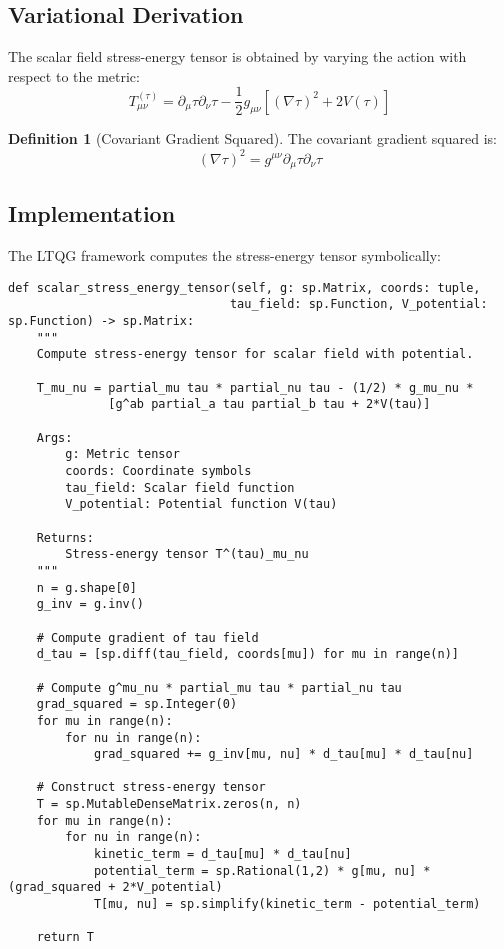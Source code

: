 \documentclass[11pt,a4paper]{article}
\theoremstyle{definition}
\newtheorem{definition}[theorem]{Definition}
\theoremstyle{remark}
\newcommand{\covd}{\nabla}
\begin{document}
\subsection{Variational Derivation}

The scalar field stress-energy tensor is obtained by varying the action with respect to the metric:
\begin{equation}
T_{\mu\nu}^{(\tau)} = \partial_\mu \tau \partial_\nu \tau - \frac{1}{2} g_{\mu\nu} \left[ (\covd \tau)^2 + 2V(\tau) \right]
\end{equation}

\begin{definition}[Covariant Gradient Squared]
The covariant gradient squared is:
\begin{equation}
(\covd \tau)^2 = g^{\mu\nu} \partial_\mu \tau \partial_\nu \tau
\end{equation}
\end{definition}

\subsection{Implementation}

The LTQG framework computes the stress-energy tensor symbolically:

\begin{lstlisting}
def scalar_stress_energy_tensor(self, g: sp.Matrix, coords: tuple, 
                               tau_field: sp.Function, V_potential: sp.Function) -> sp.Matrix:
    """
    Compute stress-energy tensor for scalar field with potential.
    
    T_mu_nu = partial_mu tau * partial_nu tau - (1/2) * g_mu_nu * 
              [g^ab partial_a tau partial_b tau + 2*V(tau)]
    
    Args:
        g: Metric tensor
        coords: Coordinate symbols  
        tau_field: Scalar field function
        V_potential: Potential function V(tau)
        
    Returns:
        Stress-energy tensor T^(tau)_mu_nu
    """
    n = g.shape[0]
    g_inv = g.inv()
    
    # Compute gradient of tau field
    d_tau = [sp.diff(tau_field, coords[mu]) for mu in range(n)]
    
    # Compute g^mu_nu * partial_mu tau * partial_nu tau
    grad_squared = sp.Integer(0)
    for mu in range(n):
        for nu in range(n):
            grad_squared += g_inv[mu, nu] * d_tau[mu] * d_tau[nu]
    
    # Construct stress-energy tensor
    T = sp.MutableDenseMatrix.zeros(n, n)
    for mu in range(n):
        for nu in range(n):
            kinetic_term = d_tau[mu] * d_tau[nu]
            potential_term = sp.Rational(1,2) * g[mu, nu] * (grad_squared + 2*V_potential)
            T[mu, nu] = sp.simplify(kinetic_term - potential_term)
    
    return T
\end{lstlisting}
\end{document}
